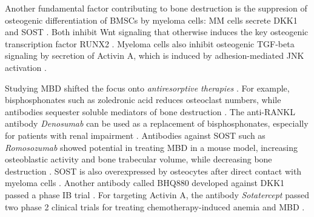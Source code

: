 Another fundamental factor contributing to bone destruction is the suppresion of
osteogenic differentiation of \acp{BMSC} by myeloma cells: \ac{MM} cells secrete
\ac{DKK1} and \ac{SOST} \cite{qiangDkk1inducedInhibitionWnt2008,
    zhouDickkopf1KeyRegulator2013, colucciMyelomaCellsSuppress2011}. Both inhibit
\ac{Wnt} signaling that otherwise induces the key osteogenic transcription
factor \ac{RUNX2} \cite{gaurCanonicalWNTSignaling2005}. Myeloma cells also
inhibit osteogenic \ac{TGF-beta} signaling by secretion of Activin A, which is
induced by adhesion-mediated \ac{JNK} activation
\cite{valletActivinPromotesMultiple2010}.

Studying \ac{MBD} shifted the focus onto \emph{antiresorptive %
    therapies} \cite{hiasaPathogenesisTreatmentMultiple2021,
    johansenNovelDevelopmentsTreatment2023}. For example, bisphosphonates such as
zoledronic acid reduces osteoclast numbers, while antibodies sequester soluble
mediators of bone destruction \cite{johansenNovelDevelopmentsTreatment2023}. The
anti-RANKL antibody \emph{Denosumab} can be used as a replacement of
bisphosphonates, especially for patients with renal impairment
\cite{rajeDenosumabZoledronicAcid2018}. Antibodies against \ac{SOST} such as
\emph{Romosozumab}  showed potential in
treating \ac{MBD} in a mouse model, increasing osteoblastic activity and bone
trabecular volume, while decreasing bone destruction
\cite{mcdonaldInhibitingOsteocytespecificProtein2017,
    ngomdirTherapeuticUseAntiSclerostin2023}. \ac{SOST} is also overexpressed by
osteocytes after direct contact with myeloma cells
\cite{delgadocalleDirectCellToCellInteractions2013}. Another antibody called
BHQ880 developed against \ac{DKK1} passed a phase IB trial
\cite{iyerPhaseIBMulticentre2014}. For targeting Activin A, the antibody
\emph{Sotatercept} passed two phase 2 clinical trials for treating
chemotherapy-induced anemia and \ac{MBD}
\cite{raftopoulosSotaterceptACE011Treatment2016,abdulkadyrovSotaterceptPatientsOsteolytic2014}.

